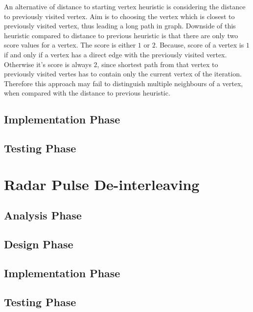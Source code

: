 \documentclass[12pt]{report}
\begin{document}
            An alternative of distance to starting vertex heuristic is considering the distance to previously visited vertex. Aim is to choosing the vertex which is closest to previously
            visited vertex, thus leading a long path in graph. Downside of this heuristic compared to distance to previous heuristic is that there are only two score values for a vertex.
            The score is either $1$ or $2$. Because, score of a vertex is $1$ if and only if a vertex has a direct edge with the previously visited vertex. Otherwise it's score is always $2$, 
            since shortest path from that vertex to previously visited vertes has to contain only the current vertex of the iteration. Therefore this approach may fail to distinguish multiple
            neighbours of a vertex, when compared with the distance to previous heuristic.
            \newline



        \subsection{Implementation Phase}

        \subsection{Testing Phase}

    \section{Radar Pulse De-interleaving}
        \subsection{Analysis Phase}

        \subsection{Design Phase}

        \subsection{Implementation Phase}

        \subsection{Testing Phase}
\end{document}
